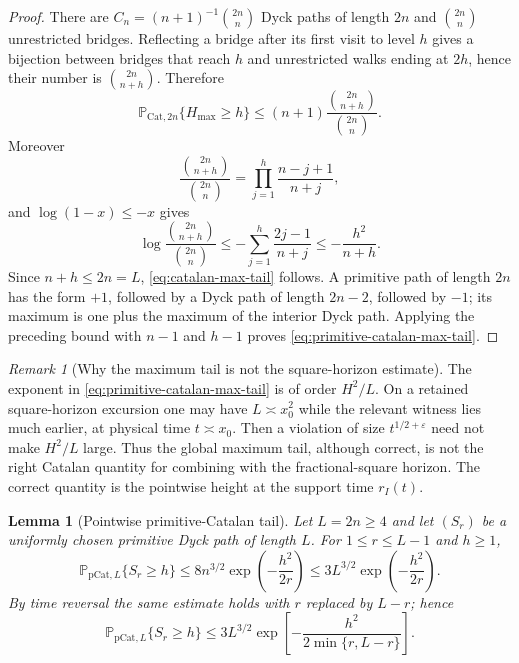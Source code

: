 \documentclass[11pt]{amsart}
\numberwithin{equation}{section}
\theoremstyle{plain}
\newtheorem{lemma}[theorem]{Lemma}
\theoremstyle{definition}
\theoremstyle{remark}
\newtheorem{remark}[theorem]{Remark}
\newcommand{\eps}{\varepsilon}
\begin{document}
\begin{proof}
There are $C_n=(n+1)^{-1}\binom{2n}{n}$ Dyck paths of length $2n$ and
$\binom{2n}{n}$ unrestricted bridges.  Reflecting a bridge after its first
visit to level $h$ gives a bijection between bridges that reach $h$ and
unrestricted walks ending at $2h$, hence their number is
$\binom{2n}{n+h}$.  Therefore
\[
 \mathbb P_{\mathrm{Cat},2n}\{H_{\max}\ge h\}
 \le (n+1)\frac{\binom{2n}{n+h}}{\binom{2n}{n}}.
\]
Moreover
\[
 \frac{\binom{2n}{n+h}}{\binom{2n}{n}}
 =\prod_{j=1}^h\frac{n-j+1}{n+j},
\]
and $\log(1-x)\le-x$ gives
\[
 \log\frac{\binom{2n}{n+h}}{\binom{2n}{n}}
 \le-\sum_{j=1}^h\frac{2j-1}{n+j}
 \le-\frac{h^2}{n+h}.
\]
Since $n+h\le2n=L$, \eqref{eq:catalan-max-tail} follows.  A primitive path
of length $2n$ has the form $+1$, followed by a Dyck path of length $2n-2$,
followed by $-1$; its maximum is one plus the maximum of the interior Dyck
path.  Applying the preceding bound with $n-1$ and $h-1$ proves
\eqref{eq:primitive-catalan-max-tail}.
\end{proof}

\begin{remark}[Why the maximum tail is not the square-horizon estimate]
\label{rem:max-tail-square-limit}
The exponent in \eqref{eq:primitive-catalan-max-tail} is of order
$H^2/L$.  On a retained square-horizon excursion one may have
$L\asymp x_0^2$ while the relevant witness lies much earlier, at physical
time $t\asymp x_0$.  Then a violation of size $t^{1/2+\eps}$ need not make
$H^2/L$ large.  Thus the global maximum tail, although correct, is not the
right Catalan quantity for combining with the fractional-square horizon.
The correct quantity is the pointwise height at the support time
$r_I(t)$.
\end{remark}

\begin{lemma}[Pointwise primitive-Catalan tail]
\label{lem:pointwise-catalan-tail}
Let $L=2n\ge4$ and let $(S_r)$ be a uniformly chosen primitive Dyck path of
length $L$.  For $1\le r\le L-1$ and $h\ge1$,
\begin{equation}
\label{eq:pointwise-catalan-tail-left}
 \mathbb P_{\mathrm{pCat},L}\{S_r\ge h\}
 \le 8n^{3/2}\exp\!\left(-\frac{h^2}{2r}\right)
 \le 3L^{3/2}\exp\!\left(-\frac{h^2}{2r}\right).
\end{equation}
By time reversal the same estimate holds with $r$ replaced by $L-r$;
hence
\begin{equation}
\label{eq:pointwise-catalan-tail-two-sided}
 \mathbb P_{\mathrm{pCat},L}\{S_r\ge h\}
 \le 3L^{3/2}
 \exp\!\left[-\frac{h^2}{2\min\{r,L-r\}}\right].
\end{equation}
\end{lemma}
\end{document}
